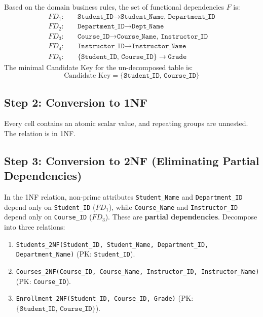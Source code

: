 Based on the domain business rules, the set of functional dependencies $F$ is:
\begin{align*}
FD_1: &\quad \texttt{Student\_ID} \rightarrow \texttt{Student\_Name, Department\_ID} \\
FD_2: &\quad \texttt{Department\_ID} \rightarrow \texttt{Dept\_Name} \\
FD_3: &\quad \texttt{Course\_ID} \rightarrow \texttt{Course\_Name, Instructor\_ID} \\
FD_4: &\quad \texttt{Instructor\_ID} \rightarrow \texttt{Instructor\_Name} \\
FD_5: &\quad \{\texttt{Student\_ID, Course\_ID}\} \rightarrow \texttt{Grade}
\end{align*}
The minimal Candidate Key for the un-decomposed table is:
\[ \boxed{\text{Candidate Key} = \{\texttt{Student\_ID, Course\_ID}\}} \]

\subsection{Step 2: Conversion to 1NF}
Every cell contains an atomic scalar value, and repeating groups are unnested. The relation is in 1NF.

\subsection{Step 3: Conversion to 2NF (Eliminating Partial Dependencies)}
In the 1NF relation, non-prime attributes \texttt{Student\_Name} and \texttt{Department\_ID} depend only on \texttt{Student\_ID} ($FD_1$), while \texttt{Course\_Name} and \texttt{Instructor\_ID} depend only on \texttt{Course\_ID} ($FD_3$). These are \textbf{partial dependencies}.
Decompose into three relations:
\begin{enumerate}
\item \texttt{Students\_2NF(Student\_ID, Student\_Name, Department\_ID, Department\_Name)} (PK: \texttt{Student\_ID}).
\item \texttt{Courses\_2NF(Course\_ID, Course\_Name, Instructor\_ID, Instructor\_Name)} (PK: \texttt{Course\_ID}).
\item \texttt{Enrollment\_2NF(Student\_ID, Course\_ID, Grade)} (PK: $\{\texttt{Student\_ID, Course\_ID}\}$).
\end{enumerate}

